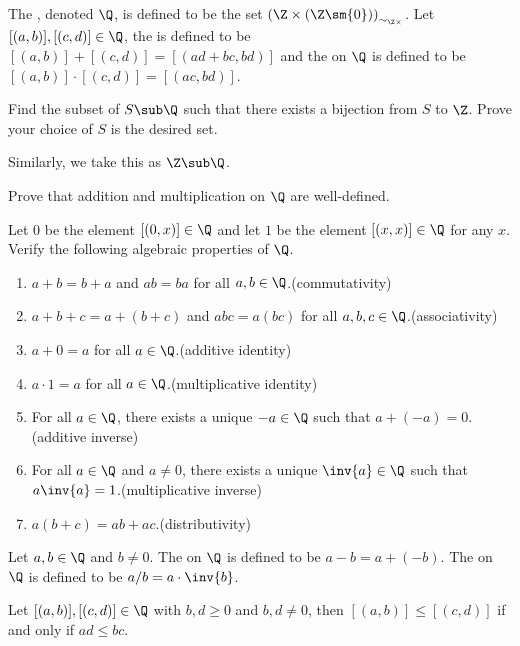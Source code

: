 \documentclass[10pt]{article}
\begin{document}
\begin{definition}
    The , denoted $\Q$, is defined to be the set ${(\Z\times(\Z\sm\{0\}))}_{{\sim}_{\Z\times}}$. Let $[(a,b)],[(c,d)]\in\Q$, the  is defined to be $[(a,b)]+[(c,d)]=[(ad+bc,bd)]$ and the  on $\Q$ is defined to be $[(a,b)]\cdot[(c,d)]=[(ac,bd)]$.
\end{definition}
\begin{problem}
    Find the subset of $S\sub\Q$ such that there exists a bijection from $S$ to $\Z$. Prove your choice of $S$ is the desired set.
\end{problem}
\par
Similarly, we take this as $\Z\sub\Q$.
\begin{problem}
    Prove that addition and multiplication on $\Q$ are well-defined.
\end{problem}
\begin{problem}
    Let $0$ be the element $[(0,x)]\in\Q$ and let $1$ be the element $[(x,x)]\in\Q$ for any $x$. Verify the following algebraic properties of $\Q$.
    \begin{enumerate}
        \item $a+b=b+a$ and $ab=ba$ for all $a,b\in\Q$.\hfill(commutativity)
        \item $a+b+c=a+(b+c)$ and $abc=a(bc)$ for all $a,b,c\in\Q$.\hfill(associativity)
        \item $a+0=a$ for all $a\in\Q$.\hfill(additive identity)
        \item $a\cdot 1=a$ for all $a\in\Q$.\hfill(multiplicative identity)
        \item For all $a\in\Q$, there exists a unique $-a\in\Q$ such that $a+(-a)=0$.\hfill(additive inverse)
        \item For all $a\in\Q$ and $a\ne 0$, there exists a unique $\inv{a}\in\Q$ such that $a\inv{a}=1$.\hfill(multiplicative inverse)
        \item $a(b+c)=ab+ac$.\hfill(distributivity) 
    \end{enumerate}
\end{problem}
\begin{definition}
    Let $a,b\in\Q$ and $b\ne 0$. The  on $\Q$ is defined to be $a-b=a+(-b)$. The  on $\Q$ is defined to be $a/b=a\cdot\inv{b}$.
\end{definition}
\par
Let $[(a,b)],[(c,d)]\in\Q$ with $b,d\ge 0$ and $b,d\ne 0$, then $[(a,b)]\le[(c,d)]$ if and only if $ad\le bc$.
\end{document}
